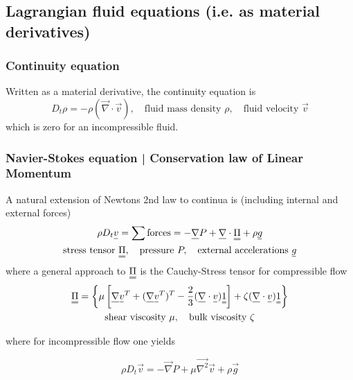 \subsection{Lagrangian fluid equations (i.e. as material derivatives)}
\subsubsection{Continuity equation}
Written as a material derivative, the continuity equation is
\begin{equation}
    D_t \rho = -\rho (\vec{\nabla} \cdot \vec{v}), \quad \text{fluid mass density } \rho, \quad \text{fluid velocity } \vec{v}
\end{equation}
which is zero for an incompressible fluid.

\subsubsection{Navier-Stokes equation | Conservation law of Linear Momentum}
A natural extension of Newtons 2nd law to continua is (including internal and external forces)
\begin{equation}
    \begin{gathered}
        \rho D_t \vec{v} = \sum \text{forces} = -\vec{\nabla} P + \vec{\nabla} \cdot \mat{\Pi} + \rho \vec{g} \\
        \text{stress tensor } \mat{\Pi}, \quad \text{pressure } P, \quad \text{external accelerations } \vec{g}
    \end{gathered}
\end{equation}
where a general approach to $\mat{\Pi}$ is the Cauchy-Stress tensor for compressible flow
\begin{equation}
    \begin{gathered}
        \mat{\Pi} = \left\{ \mu \left[ \vec{\nabla} \vec{v}^T + (\vec{\nabla} \vec{v}^T)^T - \frac{2}{3} (\vec{\nabla}\cdot \vec{v}) \mat{1} \right] + \zeta (\vec{\nabla}\cdot \vec{v}) \mat{1} \right\} \\
        \text{shear viscosity } \mu, \quad \text{bulk viscosity } \zeta
    \end{gathered}
\end{equation}

where for incompressible flow one yields

\begin{equation}
    \rho D_t \vec{v} = -\vec{\nabla} P + \mu \vec{\nabla^2} \vec{v} + \rho \vec{g}
\end{equation}

